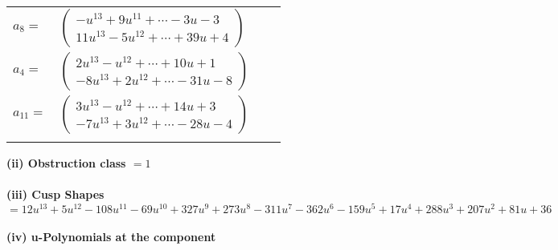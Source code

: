 \documentclass[1p]{elsarticle_modified}
\theoremstyle{definition}
\begin{document}
\begin{tabular}{m{7pt} m{180pt} m{7pt} m{180pt} }
\flushright $a_{8}=$&$\begin{pmatrix}- u^{13}+9 u^{11}+\cdots-3 u-3\\11 u^{13}-5 u^{12}+\cdots+39 u+4\end{pmatrix}$ \\
\flushright $a_{4}=$&$\begin{pmatrix}2 u^{13}- u^{12}+\cdots+10 u+1\\-8 u^{13}+2 u^{12}+\cdots-31 u-8\end{pmatrix}$ \\
\flushright $a_{11}=$&$\begin{pmatrix}3 u^{13}- u^{12}+\cdots+14 u+3\\-7 u^{13}+3 u^{12}+\cdots-28 u-4\end{pmatrix}$\\&\end{tabular}
\flushleft \textbf{(ii) Obstruction class $= 1$}\\~\\
\flushleft \textbf{(iii) Cusp Shapes $= 12 u^{13}+5 u^{12}-108 u^{11}-69 u^{10}+327 u^9+273 u^8-311 u^7-362 u^6-159 u^5+17 u^4+288 u^3+207 u^2+81 u+36$}\\~\\
\newpage\renewcommand{\arraystretch}{1}
\flushleft \textbf{(iv) u-Polynomials at the component}\newline \\
\end{document}

